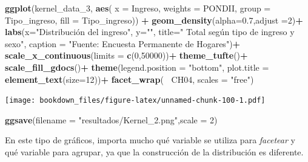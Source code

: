 \documentclass[]{book}
\newenvironment{Shaded}{\begin{snugshade}}{\end{snugshade}}
\newcommand{\DataTypeTok}[1]{\textcolor[rgb]{0.13,0.29,0.53}{#1}}
\newcommand{\DecValTok}[1]{\textcolor[rgb]{0.00,0.00,0.81}{#1}}
\newcommand{\FloatTok}[1]{\textcolor[rgb]{0.00,0.00,0.81}{#1}}
\newcommand{\KeywordTok}[1]{\textcolor[rgb]{0.13,0.29,0.53}{\textbf{#1}}}
\newcommand{\NormalTok}[1]{#1}
\newcommand{\OperatorTok}[1]{\textcolor[rgb]{0.81,0.36,0.00}{\textbf{#1}}}
\newcommand{\StringTok}[1]{\textcolor[rgb]{0.31,0.60,0.02}{#1}}
\begin{document}
\begin{Shaded}
\begin{Highlighting}[]
  \KeywordTok{ggplot}\NormalTok{(kernel_data_}\DecValTok{3}\NormalTok{, }\KeywordTok{aes}\NormalTok{(}
  \DataTypeTok{x =}\NormalTok{ Ingreso,}
  \DataTypeTok{weights =}\NormalTok{ PONDII,}
  \DataTypeTok{group =}\NormalTok{ Tipo_ingreso,}
  \DataTypeTok{fill =}\NormalTok{ Tipo_ingreso)) }\OperatorTok{+}
\StringTok{  }\KeywordTok{geom_density}\NormalTok{(}\DataTypeTok{alpha=}\FloatTok{0.7}\NormalTok{,}\DataTypeTok{adjust =}\DecValTok{2}\NormalTok{)}\OperatorTok{+}
\StringTok{  }\KeywordTok{labs}\NormalTok{(}\DataTypeTok{x=}\StringTok{"Distribución del ingreso"}\NormalTok{, }\DataTypeTok{y=}\StringTok{""}\NormalTok{,}
       \DataTypeTok{title=}\StringTok{" Total según tipo de ingreso y sexo"}\NormalTok{, }
       \DataTypeTok{caption =} \StringTok{"Fuente: Encuesta Permanente de Hogares"}\NormalTok{)}\OperatorTok{+}
\StringTok{  }\KeywordTok{scale_x_continuous}\NormalTok{(}\DataTypeTok{limits =} \KeywordTok{c}\NormalTok{(}\DecValTok{0}\NormalTok{,}\DecValTok{50000}\NormalTok{))}\OperatorTok{+}
\StringTok{  }\KeywordTok{theme_tufte}\NormalTok{()}\OperatorTok{+}
\StringTok{  }\KeywordTok{scale_fill_gdocs}\NormalTok{()}\OperatorTok{+}
\StringTok{  }\KeywordTok{theme}\NormalTok{(}\DataTypeTok{legend.position =} \StringTok{"bottom"}\NormalTok{,}
        \DataTypeTok{plot.title      =} \KeywordTok{element_text}\NormalTok{(}\DataTypeTok{size=}\DecValTok{12}\NormalTok{))}\OperatorTok{+}
\StringTok{  }\KeywordTok{facet_wrap}\NormalTok{(}\OperatorTok{~}\StringTok{ }\NormalTok{CH04, }\DataTypeTok{scales =} \StringTok{"free"}\NormalTok{)}
\end{Highlighting}
\end{Shaded}

\texttt{[image: bookdown\_files/figure-latex/unnamed-chunk-100-1.pdf]}

\begin{Shaded}
\begin{Highlighting}[]
\KeywordTok{ggsave}\NormalTok{(}\DataTypeTok{filename =} \StringTok{"resultados/Kernel_2.png"}\NormalTok{,}\DataTypeTok{scale =} \DecValTok{2}\NormalTok{)}
\end{Highlighting}
\end{Shaded}

En este tipo de gráficos, importa mucho qué variable se utiliza para \emph{facetear} y qué variable para agrupar, ya que la construcción de la distribución es diferente.
\end{document}
